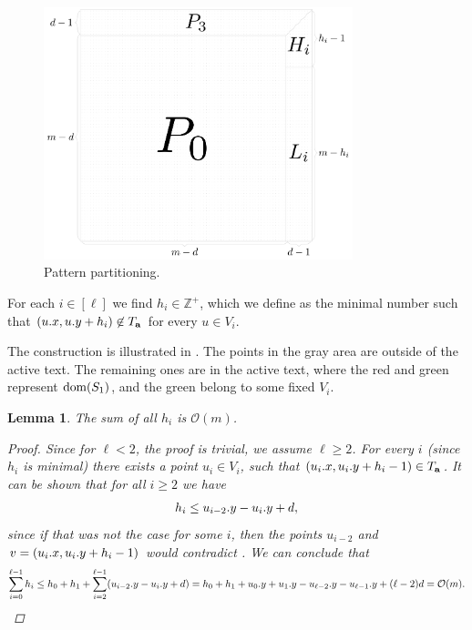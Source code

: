 \documentclass[11pt]{article}
\newcommand{\Z}{\mathbb{Z}}
\renewcommand{\O}{\mathcal{O}}
\theoremstyle{plain}
\newtheorem{lemma}{Lemma}
\theoremstyle{definition}
\theoremstyle{remark}
\begin{document}
\begin{figure}[!t]
	\begin{center}
		\includegraphics[width=0.8\textwidth]{drawings/pattern_restriction}
	\end{center}
	\caption{Pattern partitioning.}
	\label{figure:pattern_restriction}
\end{figure}

For each $i \in [\ell]$ we find $h_i \in \Z^+$, which we define as the minimal number such that $(u.x, u.y + h_i) \not \in T_\mathbf{a}$ for every $u \in V_i$.

The construction is illustrated in .
The points in the gray area are outside of the active text.
The remaining ones are in the active text, where the red and green represent $\operatorname*{dom}(S_1)$, and the green belong to some fixed $V_i$.

\begin{lemma}\label{sum_of_h}
	The sum of all $h_i$ is $\O(m)$.
	\begin{proof}
		Since for $\ell < 2$, the proof is trivial, we assume $\ell \ge 2$.
		For every $i$ (since $h_i$ is minimal) there exists a point $u_i \in V_i$, such that $(u_i.x, u_i.y + h_i - 1) \in T_\mathbf{a}$.
		It can be shown that for all $i \ge 2$ we have
		\[ h_{i} \le u_{i - 2}.y - u_{i}.y + d,\]
		since if that was not the case for some $i$, then the points $u_{i - 2}$ and $v = (u_{i}.x, u_{i}.y + h_{i} - 1)$ would contradict .
		We can conclude that
		\[
			\sum_{i = 0}^{\ell - 1} h_i
			\le h_0 + h_1 + \sum_{i = 2}^{\ell - 1} (\y{u_{i - 2}} - \y{u_i} + d)
			= h_0 + h_1 + \y{u_0} + \y{u_1} - \y{u_{\ell - 2}} - \y{u_{\ell - 1}} + (\ell - 2)d 
			= \O(m).
		\]
	\end{proof}
\end{lemma}
\end{document}

